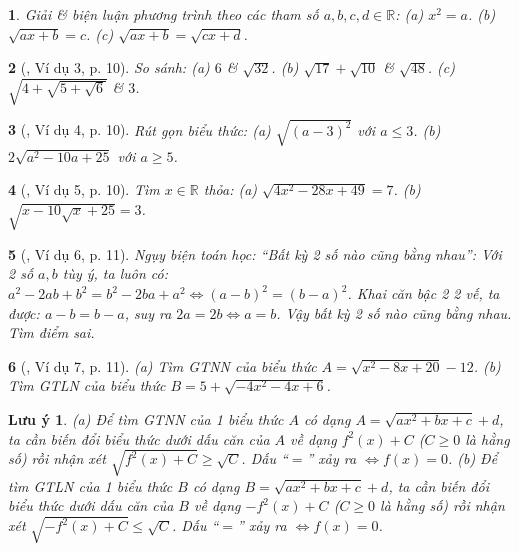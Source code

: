 \documentclass{article}
\newtheorem{baitoan}{}
\newtheorem{luuy}{Lưu ý}
\begin{document}
\begin{baitoan}
	Giải \& biện luận phương trình theo các tham số $a,b,c,d\in\mathbb{R}$: (a) $x^2 = a$. (b) $\sqrt{ax + b} = c$. (c) $\sqrt{ax + b} = \sqrt{cx + d}$.
\end{baitoan}

\begin{baitoan}[\cite{Binh_boi_duong_Toan_9_tap_1}, Ví dụ 3, p. 10]
	So sánh: (a) $6$ \& $\sqrt{32}$. (b) $\sqrt{17} + \sqrt{10}$ \& $\sqrt{48}$. (c) $\sqrt{4 + \sqrt{5 + \sqrt{6}}}$ \& $3$.
\end{baitoan}

\begin{baitoan}[\cite{Binh_boi_duong_Toan_9_tap_1}, Ví dụ 4, p. 10]
	Rút gọn biểu thức: (a) $\sqrt{(a - 3)^2}$ với $a\le3$. (b) $2\sqrt{a^2 - 10a + 25}$ với $a\ge5$.
\end{baitoan}

\begin{baitoan}[\cite{Binh_boi_duong_Toan_9_tap_1}, Ví dụ 5, p. 10]
	Tìm $x\in\mathbb{R}$ thỏa: (a) $\sqrt{4x^2 - 28x + 49} = 7$. (b) $\sqrt{x - 10\sqrt{x} + 25} = 3$.
\end{baitoan}

\begin{baitoan}[\cite{Binh_boi_duong_Toan_9_tap_1}, Ví dụ 6, p. 11]
	Ngụy biện toán học: ``Bất kỳ 2 số nào cũng bằng nhau'': Với 2 số $a,b$ tùy ý, ta luôn có: $a^2 - 2ab + b^2 = b^2 - 2ba + a^2\Leftrightarrow(a - b)^2 = (b - a)^2$. Khai căn bậc 2 2 vế, ta được: $a - b = b - a$, suy ra $2a = 2b\Leftrightarrow a = b$. Vậy bất kỳ 2 số nào cũng bằng nhau. Tìm điểm sai.
\end{baitoan}

\begin{baitoan}[\cite{Binh_boi_duong_Toan_9_tap_1}, Ví dụ 7, p. 11]
	(a) Tìm {\rm {\rm GTNN}} của biểu thức $A = \sqrt{x^2 - 8x + 20} - 12$. (b) Tìm {\rm GTLN} của biểu thức $B = 5 + \sqrt{-4x^2 - 4x + 6}$.
\end{baitoan}

\begin{luuy}
	(a) Để tìm {\rm {\rm GTNN}} của 1 biểu thức $A$ có dạng $A = \sqrt{ax^2 + bx + c} + d$, ta cần biến đổi biểu thức dưới dấu căn của $A$ về dạng $f^2(x) + C$ ($C\ge0$ là hằng số) rồi nhận xét $\sqrt{f^2(x) + C}\ge\sqrt{C}$. Dấu ``$=$'' xảy ra $\Leftrightarrow f(x) = 0$. (b) Để tìm {\rm GTLN} của 1 biểu thức $B$ có dạng $B = \sqrt{ax^2 + bx + c} + d$, ta cần biến đổi biểu thức dưới dấu căn của $B$ về dạng $-f^2(x) + C$ ($C\ge0$  là hằng số) rồi nhận xét $\sqrt{-f^2(x) + C}\le\sqrt{C}$. Dấu ``$=$'' xảy ra $\Leftrightarrow f(x) = 0$.
\end{luuy}
\end{document}
